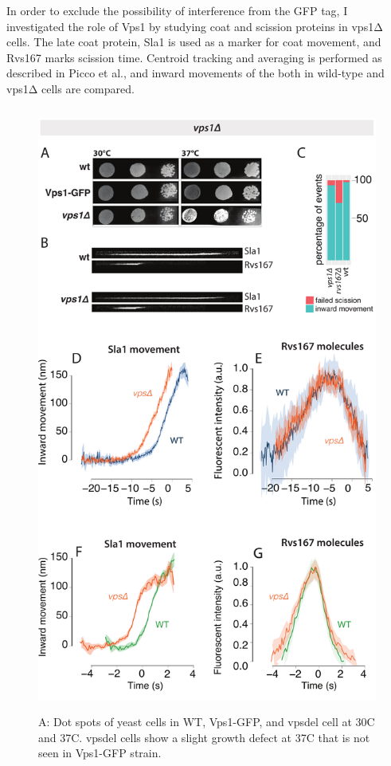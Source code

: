 	\vspace{5mm}
	In order to exclude the possibility of interference from the GFP tag, I investigated the role of Vps1 by studying coat and scission proteins in vps1Δ cells. The late coat protein, Sla1 is used as a marker for coat movement, and Rvs167 marks scission time. Centroid tracking and averaging is performed as described in Picco et al., and inward movements of the both in wild-type and vps1Δ cells are compared. 

	\begin{figure}
	\centering
	\includegraphics[width=20cm,height=20cm,keepaspectratio]{figures/results_final/vps}
	\caption[Rvs localization in vps deletion]
	{A: Dot spots of yeast cells in WT, Vps1-GFP, and vpsdel cell at 30C and 37C. vpsdel cells show a slight growth defect at 37C that is not seen in Vps1-GFP strain. 
}
\end{figure}
